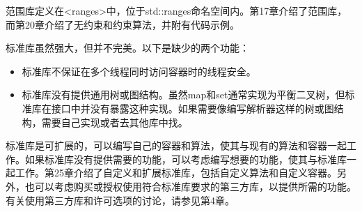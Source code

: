 
范围库定义在<ranges>中，位于std::ranges命名空间内。第17章介绍了范围库，而第20章介绍了无约束和约束算法，并附有代码示例。


标准库虽然强大，但并不完美。以下是缺少的两个功能：

\begin{itemize}
\item
标准库不保证在多个线程同时访问容器时的线程安全。

\item
标准库没有提供通用树或图结构。虽然map和set通常实现为平衡二叉树，但标准库在接口中并没有暴露这种实现。如果需要像编写解析器这样的树或图结构，需要自己实现或者去其他库中找。
\end{itemize}

标准库是可扩展的，可以编写自己的容器和算法，使其与现有的算法和容器一起工作。如果标准库没有提供需要的功能，可以考虑编写想要的功能，使其与标准库一起工作。第25章介绍了自定义和扩展标准库，包括自定义算法和自定义容器。另外，也可以考虑购买或授权使用符合标准库要求的第三方库，以提供所需的功能。有关使用第三方库和许可选项的讨论，请参见第4章。






